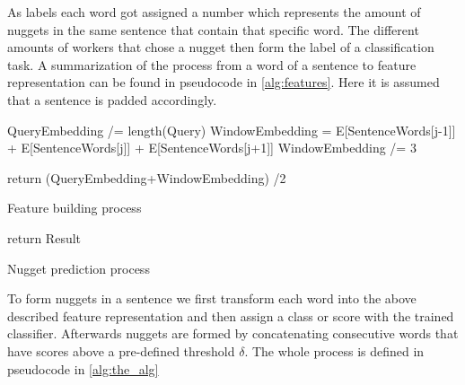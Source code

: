\documentclass{article}
\begin{document}
As labels each word got assigned a number which represents the amount of nuggets in the same sentence that contain that specific word. The different amounts of workers that chose a nugget then form the label of a classification task. A summarization of the process from a word of a sentence to feature representation can be found in pseudocode in  \ref{alg:features}. Here it is assumed that a sentence is padded accordingly.

\begin{algorithm}
	\label{alg:features}


	QueryEmbedding /= length(Query)\;
	WindowEmbedding = E[SentenceWords[j-1]] + E[SentenceWords[j]] + E[SentenceWords[j+1]]\;
	WindowEmbedding /= 3\;


	return (QueryEmbedding+WindowEmbedding) /2 \;

	\caption{Feature building process}
\end{algorithm}


\begin{algorithm}
	\label{alg:the_alg}
	return Result \;

	\caption{Nugget prediction process}
\end{algorithm}
To form nuggets in a sentence we first transform each word into the above described feature representation and then assign a class or score with the trained classifier. Afterwards nuggets are formed by concatenating consecutive words that have scores above a pre-defined threshold $\delta$. The whole process is defined in pseudocode in \ref{alg:the_alg}
\end{document}
